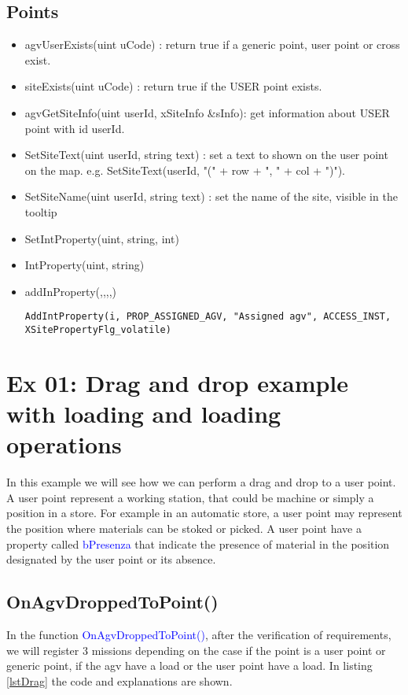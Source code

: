 \subsection{Points}

\begin{itemize}
	\item agvUserExists(uint uCode) : return true if a generic point, user point or cross exist.
	\item siteExists(uint uCode) : return true if the USER point exists.
	\item agvGetSiteInfo(uint userId, xSiteInfo \&sInfo): get information about USER point with id userId.
	\item SetSiteText(uint userId, string text) : set a text to shown on the user point on the map. e.g. SetSiteText(userId, "(" + row + ", " + col + ")").
	\item SetSiteName(uint userId, string text) : set the name of the site, visible in the tooltip\\
\end{itemize}

\begin{itemize}
	\item SetIntProperty(uint, string, int)
	\item IntProperty(uint, string)
	\item addInProperty(,,,,)
	\begin{lstlisting}[frame=none]
	AddIntProperty(i, PROP_ASSIGNED_AGV, "Assigned agv", ACCESS_INST, XSitePropertyFlg_volatile)
	\end{lstlisting}
\end{itemize}	

\section{Ex 01: Drag and drop example with loading and loading operations}

In this example we will see how we can perform a drag and drop to a user point. A user point represent a working station, that could be machine or simply a position in a store. For example in an automatic store, a user point may represent the position where materials can be stoked or picked. A user point have a property called \textcolor{blue}{bPresenza} that indicate the presence of material in the position designated by the user point or its absence.\\

\subsection*{OnAgvDroppedToPoint()}
In the function \textcolor{blue}{OnAgvDroppedToPoint()}, after the verification of requirements, we will register 3 missions depending on the case if the point is a user point or generic point, if the agv have a load or the user point have a load. In listing \ref{lstDrag} the code and explanations are shown.

